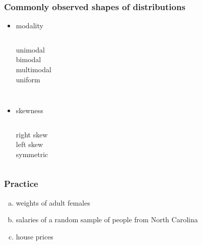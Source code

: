 \documentclass[slidestop,compress,mathserif]{beamer}
\begin{document}
\begin{frame}
\frametitle{Commonly observed shapes of distributions}

\begin{itemize}

\item modality \\
$\:$ \\
\pause

\begin{columns}[c]
unimodal \\
\pause
{}
bimodal \\
\pause
{}
multimodal \\
\pause
{}
uniform
\end{columns}

\pause

$\:$ \\

\item skewness \\
$\:$ \\
\pause

\begin{columns}[c]
right skew \\
\pause
{}
left skew \\
\pause
{}
symmetric \\
\end{columns}

\end{itemize}

\end{frame}


\begin{frame}
\frametitle{Practice}


\begin{enumerate}[(a)]
\item weights of adult females
\item salaries of a random sample of people from North Carolina
\item house prices
\end{enumerate}

\end{frame}
\end{document}
